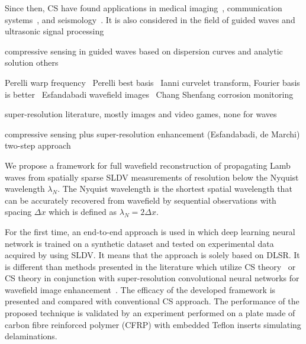 Since then, CS have found applications in medical imaging~\cite{Lustig2007}, communication systems~\cite{Gao2018}, and seismology~\cite{Herrmann2012}.
It is also considered in the field of guided waves and ultrasonic signal processing~\cite{Harley2013,Mesnil2016,Perelli2012,Perelli2015,DiIanni2015,KeshmiriEsfandabadi2018,Chang2020}

{\color{RubineRed}

compressive sensing in guided waves
based on dispersion curves and analytic solution
\cite{Harley2013,Mesnil2016}
others

Perelli warp frequency~\cite{Perelli2012}
Perelli best basis~\cite{Perelli2015}
Ianni curvelet transform, Fourier basis is better~\cite{DiIanni2015}
Esfandabadi wavefield images~\cite{KeshmiriEsfandabadi2018}
Chang Shenfang corrosion monitoring ~\cite{Chang2020}

super-resolution literature, mostly images and video games, none for waves

compressive sensing plus super-resolution enhancement (Esfandabadi, de Marchi)
two-step approach
~\cite{Park2017a,KeshmiriEsfandabadi2020}
}

We propose a framework for full wavefield reconstruction of propagating Lamb waves from spatially sparse SLDV measurements of resolution below the Nyquist wavelength $\lambda_N$. 
The Nyquist wavelength is the shortest spatial wavelength that can be accurately recovered from wavefield by sequential observations with spacing $\Delta x$ which is defined as $\lambda_N = 2 \Delta x$. 

For the first time, an end-to-end approach is used in which deep learning neural network is trained on a synthetic dataset and tested on experimental data acquired by using SLDV.
It means that the approach is solely based on DLSR.
It is different than methods presented in the literature which utilize CS theory~\cite{Harley2013,KeshmiriEsfandabadi2018} or CS theory in conjunction with super-resolution convolutional neural networks for wavefield image enhancement~\cite{Park2017a,KeshmiriEsfandabadi2020}.
The efficacy of the developed framework is presented and compared with conventional CS approach.  
The performance of the proposed technique is validated by an experiment performed on a plate made of carbon fibre reinforced polymer (CFRP) with embedded Teflon inserts simulating delaminations.
